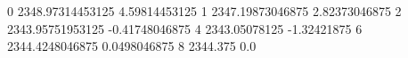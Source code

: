 0 2348.97314453125 4.59814453125
1 2347.19873046875 2.82373046875
2 2343.95751953125 -0.41748046875
4 2343.05078125 -1.32421875
6 2344.4248046875 0.0498046875
8 2344.375 0.0
